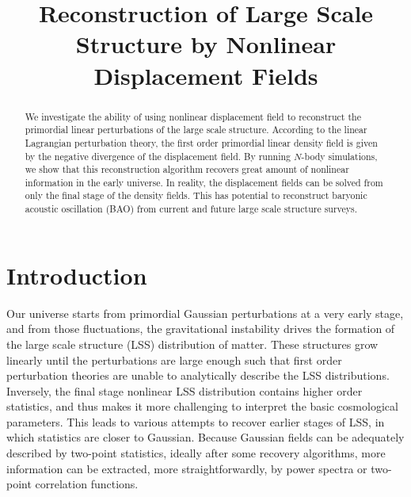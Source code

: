\documentclass[aps,prd,twocolumn,superscriptaddress,amsfont,amssymb,amsmath,nofootinbib,showpacs,balancelastpage]{revtex4-1}
\begin{document}
\addtolength{\hoffset}{-0.525cm}
\addtolength{\textwidth}{1.05cm}
\title{Reconstruction of Large Scale Structure by Nonlinear Displacement Fields}




\begin{abstract}
We investigate the ability of using nonlinear displacement field to reconstruct 
the primordial linear perturbations of the large scale structure. According to 
the linear Lagrangian perturbation theory, the first order primordial linear 
density field is given by the negative divergence of the displacement field. By 
running $N$-body simulations, we show that this reconstruction algorithm recovers 
great amount of nonlinear information in the early universe. In reality, the 
displacement fields can be solved from only the final stage of the density 
fields. This has potential to reconstruct baryonic acoustic oscillation (BAO) 
from current and future large scale structure surveys.

\end{abstract}


\maketitle

\section{Introduction}\label{sec.intro}
Our universe starts from primordial Gaussian perturbations at a very early stage, 
and from those fluctuations, the gravitational instability drives the formation of 
the large scale structure (LSS) distribution of matter. These structures grow 
linearly until the perturbations are large enough such that first order 
perturbation theories are unable to analytically describe the LSS distributions. 
Inversely, the final stage nonlinear LSS distribution contains higher order 
statistics, and thus makes it more challenging to interpret the basic cosmological 
parameters. This leads to various attempts to recover earlier stages of LSS, in 
which statistics are closer to Gaussian. Because Gaussian fields can be adequately 
described by two-point statistics, ideally after some recovery algorithms, more 
information can be extracted, more straightforwardly, by power spectra or two-point 
correlation functions.
\end{document}
